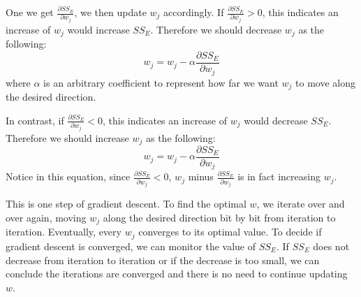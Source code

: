 \documentclass[
	letterpaper
]{article}
\begin{document}
One we get $\frac{\partial SS_E}{\partial w_j}$, we then update $w_j$ accordingly.
If $\frac{\partial SS_E}{\partial w_j} > 0$, this indicates an increase of $w_j$ would increase $SS_E$.
Therefore we should decrease $w_j$ as the following:
\begin{equation}
w_j = w_j - \alpha \frac{\partial SS_E}{\partial w_j} 
\end{equation}
where $\alpha$ is an arbitrary coefficient to represent how far we want $w_j$ to move along the desired direction.
 
In contrast, if $\frac{\partial SS_E}{\partial w_j} < 0$, this indicates an increase of $w_j$ would decrease $SS_E$.
Therefore we should increase $w_j$ as the following:
\begin{equation}
w_j = w_j - \alpha \frac{\partial SS_E}{\partial w_j} 
\end{equation}
Notice in this equation, since $\frac{\partial SS_E}{\partial w_j} < 0$, $w_j$ minus $\frac{\partial SS_E}{\partial w_j}$ is in fact increasing $w_j$.

This is one step of gradient descent. 
To find the optimal $w$, we iterate over and over again, moving $w_j$ along the desired direction bit by bit from iteration to iteration.
Eventually, every $w_j$ converges to its optimal value.
To decide if gradient descent is converged, we can monitor the value of $SS_E$.
If $SS_E$ does not decrease from iteration to iteration or if the decrease is too small, we can conclude the iterations are converged and there is no need to continue updating $w$.
\end{document}
